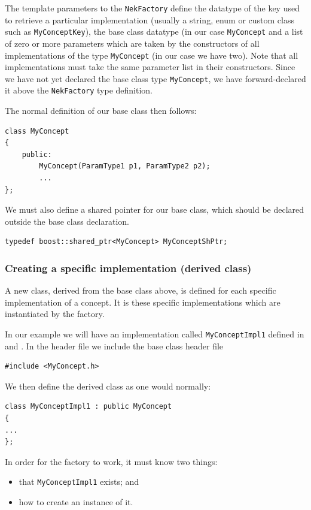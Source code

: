 The template parameters to the \lstinline{NekFactory} define the datatype of the key used to retrieve a
particular implementation (usually a string, enum or custom class such as
\lstinline{MyConceptKey}), the base class datatype (in our case \lstinline{MyConcept} and a list
of zero or more parameters which are taken by the constructors of all
implementations of the type \lstinline{MyConcept} (in our case we have two). Note
that all implementations must take the same parameter list in their constructors. Since we have not yet declared the base class type \lstinline{MyConcept}, we have forward-declared it above the \lstinline{NekFactory} type definition.

The normal definition of our base class then follows:
\begin{lstlisting}
class MyConcept 
{
    public:
        MyConcept(ParamType1 p1, ParamType2 p2);
        ...
};
\end{lstlisting}

We must also define a shared pointer for our base class, which should be declared outside the base class declaration.
\begin{lstlisting}
typedef boost::shared_ptr<MyConcept> MyConceptShPtr;
\end{lstlisting}


\subsubsection{Creating a specific implementation (derived class)}
A new class, derived from the base class above, is defined for each specific implementation of a concept. It is these
specific implementations which are instantiated by the factory.

In our example we will have an implementation called \lstinline{MyConceptImpl1}
defined in  and . In the
header file we include the base class header file
\begin{lstlisting}
#include <MyConcept.h>
\end{lstlisting}

We then define the derived class as one would normally:
\begin{lstlisting}
class MyConceptImpl1 : public MyConcept
{
...
};
\end{lstlisting}

In order for the factory to work, it must know two things:
\begin{itemize}
\item that \lstinline{MyConceptImpl1} exists; and
\item how to create an instance of it.
\end{itemize}

